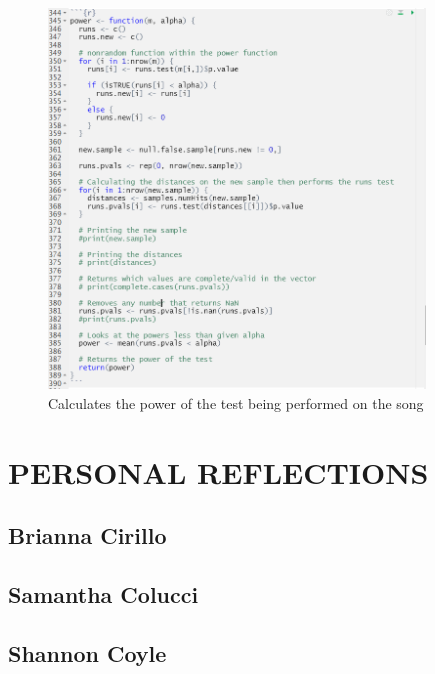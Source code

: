 \documentclass[12pt, letterpaper]{article}
\begin{document}
\begin{figure}
\centering
\includegraphics[width=10cm]{PowerCode.png}
\caption{Calculates the power of the test being performed on the song}
\label{fig: Power Code}
\end{figure}


\section{PERSONAL REFLECTIONS}
\subsection{Brianna Cirillo}
\subsection{Samantha Colucci}
\subsection{Shannon Coyle}
\end{document}
